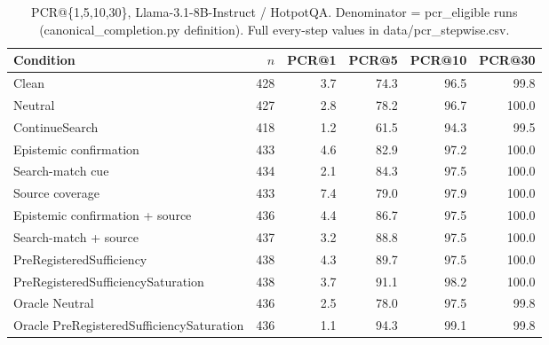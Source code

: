 \begin{table}[t]
\centering
\caption{PCR@\{1,5,10,30\}, Llama-3.1-8B-Instruct / HotpotQA. Denominator = pcr\_eligible runs (canonical\_completion.py definition). Full every-step values in data/pcr_stepwise.csv.}
\begin{tabular}{lrrrrr}
\toprule
Condition & $n$ & PCR@1 & PCR@5 & PCR@10 & PCR@30 \\
\midrule
Clean & 428 & 3.7 & 74.3 & 96.5 & 99.8 \\
Neutral & 427 & 2.8 & 78.2 & 96.7 & 100.0 \\
ContinueSearch & 418 & 1.2 & 61.5 & 94.3 & 99.5 \\
Epistemic confirmation & 433 & 4.6 & 82.9 & 97.2 & 100.0 \\
Search-match cue & 434 & 2.1 & 84.3 & 97.5 & 100.0 \\
Source coverage & 433 & 7.4 & 79.0 & 97.9 & 100.0 \\
Epistemic confirmation + source & 436 & 4.4 & 86.7 & 97.5 & 100.0 \\
Search-match + source & 437 & 3.2 & 88.8 & 97.5 & 100.0 \\
PreRegisteredSufficiency & 438 & 4.3 & 89.7 & 97.5 & 100.0 \\
PreRegisteredSufficiencySaturation & 438 & 3.7 & 91.1 & 98.2 & 100.0 \\
Oracle Neutral & 436 & 2.5 & 78.0 & 97.5 & 99.8 \\
Oracle PreRegisteredSufficiencySaturation & 436 & 1.1 & 94.3 & 99.1 & 99.8 \\
\bottomrule
\end{tabular}
\end{table}

